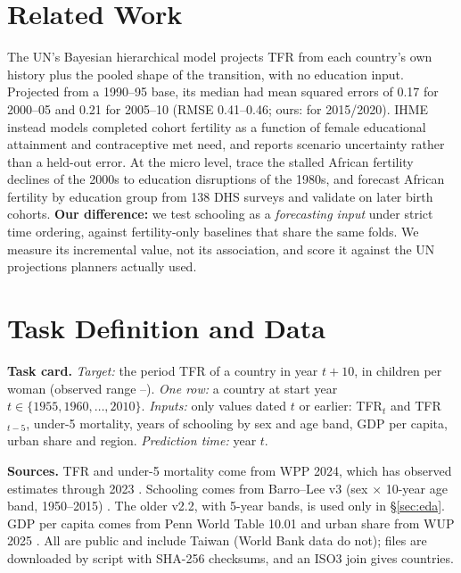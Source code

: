 \documentclass[11pt]{article}
\begin{document}
\section{Related Work}
The UN's Bayesian hierarchical model \citep{alkema2011probabilistic,raftery2014bayesian} projects TFR from each country's own history plus the pooled shape of the transition, with no education input. Projected from a 1990--95 base, its median had mean squared errors of 0.17 for 2000--05 and 0.21 for 2005--10 (RMSE 0.41--0.46; ours: \teRmseOurs{} for 2015/2020). IHME \citep{vollset2020fertility} instead models completed cohort fertility as a function of female educational attainment and contraceptive met need, and reports scenario uncertainty rather than a held-out error. At the micro level, \citet{kebede2019stalls} trace the stalled African fertility declines of the 2000s to education disruptions of the 1980s, and \citet{adhikari2024forecasting} forecast African fertility by education group from 138 DHS surveys and validate on later birth cohorts. \textbf{Our difference:} we test schooling as a \emph{forecasting input} under strict time ordering, against fertility-only baselines that share the same folds. We measure its incremental value, not its association, and score it against the UN projections planners actually used.


\section{Task Definition and Data}
\label{sec:data}
\textbf{Task card.} \emph{Target:} the period TFR of a country in year $t{+}10$, in children per woman (observed range \yMin--\yMax). \emph{One row:} a country at start year $t\in\{1955,1960,\dots,2010\}$. \emph{Inputs:} only values dated $t$ or earlier: TFR$_t$ and TFR$_{t-5}$, under-5 mortality, years of schooling by sex and age band, GDP per capita, urban share and region. \emph{Prediction time:} year $t$.

\textbf{Sources.} TFR and under-5 mortality come from WPP 2024, which has observed estimates through 2023 \citep{un2024wpp}. Schooling comes from Barro--Lee v3 (sex $\times$ 10-year age band, 1950--2015) \citep{barro2013new}. The older v2.2, with 5-year bands, is used only in \S\ref{sec:eda}. GDP per capita comes from Penn World Table 10.01 \citep{feenstra2015next} and urban share from WUP 2025 \citep{un2025wup}. All are public and include Taiwan (World Bank data do not); files are downloaded by script with SHA-256 checksums, and an ISO3 join gives \nCountries{} countries.
\end{document}
